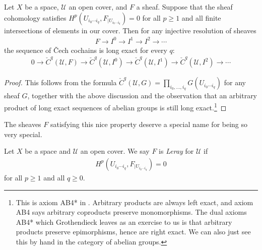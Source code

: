 \documentclass[11pt]{amsart}
\begin{document}
\begin{proposition} Let $X$ be a space, $\mathcal{U}$ an open cover, and $F$ a sheaf. Suppose that the sheaf cohomology satisfies $H^p(U_{i_0 \cdots i_q}, F_{|U_{i_0 \cdots i_q}}) = 0$ for all $p\ge1$ and all finite intersections of elements in our cover. Then for any injective resolution of sheaves
\begin{align*}
    F \to I^0 \to I^1 \to I^2 \to \cdots
\end{align*}
the sequence of \v{C}ech cochains is long exact for every $q$:
\begin{equation}\label{eqn:LES-cech-cochains-leray-cover}
\begin{aligned}
    0 \to \check{C}^q(\mathcal{U},F) \to \check{C}^q(\mathcal{U},I^0) \to \check{C}^q(\mathcal{U},I^1) \to \check{C}^q(\mathcal{U},I^2) \to \cdots
\end{aligned}
\end{equation}
\end{proposition}
\begin{proof} This follows from the formula $\check{C}^q(\mathcal{U},G) = \prod_{i_0, \ldots, i_q} G(U_{i_0 \cdots i_q})$ for any sheaf $G$, together with the above discussion and the observation that an arbitrary product of long exact sequences of abelian groups is still long exact.\footnote{ This is axiom AB4* in \cite{Tohoku}. Arbitrary products are always left exact, and axiom AB4 says arbitrary coproducts preserve monomorphisms. The dual axioms AB4* which Grothendieck leaves as an exercise to us is that arbitrary products preserve epimorphisms, hence are right exact. We can also just see this by hand in the category of abelian groups.}
\end{proof}

The sheaves $F$ satisfying this nice property deserve a special name for being so very special.

\begin{definition}\label{def:Leray-cover} Let $X$ be a space and $\mathcal{U}$ an open cover.
We say $F$ is \emph{Leray} for $\mathcal{U}$ if
\begin{align*}
    H^p(U_{i_0 \cdots i_q},F_{|U_{i_0 \cdots i_q}}) =0
\end{align*}
for all $p\ge1$ and all $q\ge0$.
\end{definition}
\end{document}
